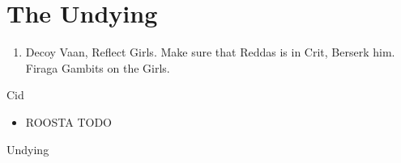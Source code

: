 \chapter{The Undying}
\begin{enumerate}
\item Decoy Vaan, Reflect Girls. Make sure that Reddas is in Crit, Berserk him. Firaga Gambits on the Girls.
\end{enumerate}
\begin{battle}{Cid}
\begin{itemize}
\item ROOSTA TODO
\end{itemize}
\end{battle}
\begin{battle}{Undying}

\end{battle}